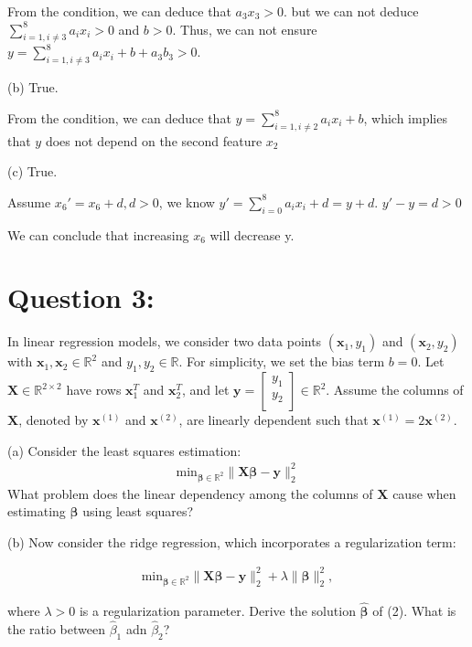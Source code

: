 \documentclass[a4paper,12pt]{article}
\newcommand{\R}{\mathbb{R}}
\begin{document}
From the condition, we can deduce that \(a_3x_3 > 0\).
but we can not deduce \(\sum_{i = 1, i \neq 3}^{8}a_ix_i > 0\) and \(b > 0\).
Thus, we can not ensure \(y = \sum_{i = 1, i \neq 3}^{8}a_ix_i + b + a_3b_3 > 0\).

(b) True.

From the condition, we can deduce that \(y = \sum_{i = 1, i \neq 2}^{8} a_ix_i + b\),
which implies that \(y\) does not depend on the second feature \(x_2\)

(c) True.

Assume \(x_6' = x_6 + d, d > 0\), we know \(y' = \sum_{i=0}^{8} a_ix_i + d = y + d\).
\(y' - y = d > 0\)

We can conclude that increasing \(x_6\) will decrease y.

\section*{Question 3:}
In linear regression models, we consider two data points \((\bm{x}_1, y_1)\) and \((\bm{x}_2, y_2)\) with \(\bm{x}_1, \bm{x}_2 \in \R^2\)
and \(y_1, y_2 \in \R\). For simplicity, we set the bias term \(b = 0\). Let \(\bm{X} \in \R^{2 \times 2}\) have rows \(\bm{x}_1^T\) and \(\bm{x}_2^T\),
and let \(\bm{y} = \begin{bmatrix}
    y_1 \\
    y_2 \\
\end{bmatrix} \in \R^2\). Assume the columns of \(\bm{X}\), denoted by \(\bm{x}^{(1)}\) and \(\bm{x}^{(2)}\), are linearly dependent such that
\(\bm{x}^{(1)} = 2\bm{x}^{(2)}\).

(a) Consider the least squares estimation:
\begin{align}
    \text{min}_{\bm{\beta} \in \R^2}\|\bm{X}\bm{\beta} - \bm{y}\|_2^2 
\end{align}
What problem does the linear dependency among the columns of \(\bm{X}\) cause when estimating \(\bm{\beta}\) using least squares?

(b) Now consider the ridge regression, which incorporates a regularization term:

\begin{align}
    \text{min}_{\bm{\beta} \in \R^2}\|\bm{X}\bm{\beta} - \bm{y}\|_2^2 + \lambda\|\bm{\beta}\|_2^2,
\end{align}

where \(\lambda > 0\) is a regularization parameter. Derive the solution \(\hat{\bm{\beta}}\) of (2). What is the ratio between \(\hat{\beta}_1\) adn \(\hat{\beta}_2\)?
\end{document}
